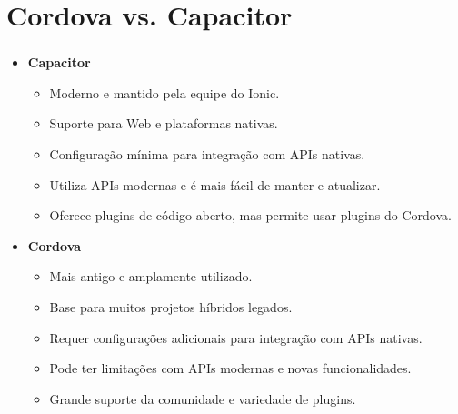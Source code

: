 \documentclass[aspectratio=169]{beamer}
\begin{document}
	\section{Cordova vs. Capacitor}
	\begin{frame}[fragile]
		\frametitle{\secname}
		\begin{itemize}
			\item \textbf{Capacitor}
			\begin{itemize}
				\item Moderno e mantido pela equipe do Ionic.
				\item Suporte para Web e plataformas nativas.
				\item Configuração mínima para integração com APIs nativas.
				\item Utiliza APIs modernas e é mais fácil de manter e atualizar.
				\item Oferece plugins de código aberto, mas permite usar plugins do Cordova.
			\end{itemize}
			\item \textbf{Cordova}
			\begin{itemize}
				\item Mais antigo e amplamente utilizado.
				\item Base para muitos projetos híbridos legados.
				\item Requer configurações adicionais para integração com APIs nativas.
				\item Pode ter limitações com APIs modernas e novas funcionalidades.
				\item Grande suporte da comunidade e variedade de plugins.
			\end{itemize}
		\end{itemize}
	\end{frame}
	
	
\end{document}

